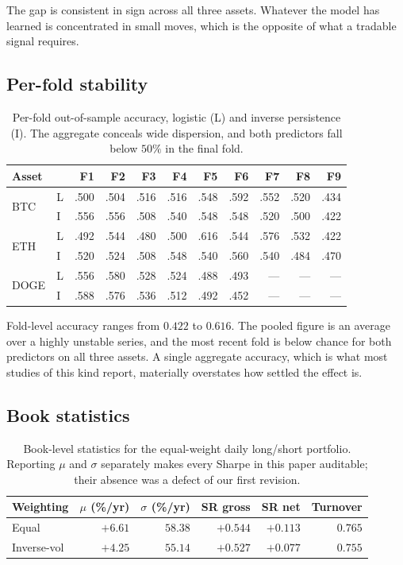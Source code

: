 \documentclass[preprint,12pt,authoryear]{elsarticle}
\begin{document}
The gap is consistent in sign across all three assets. Whatever the model has
learned is concentrated in small moves, which is the opposite of what a tradable
signal requires.

\subsection{Per-fold stability}

\begin{table}[t]\centering\small
\caption{Per-fold out-of-sample accuracy, logistic (L) and inverse persistence
(I). The aggregate conceals wide dispersion, and both predictors fall below
$50\%$ in the final fold.}
\label{tab:folds}
\begin{tabular}{@{}llrrrrrrrrr@{}}
\toprule
Asset & & F1 & F2 & F3 & F4 & F5 & F6 & F7 & F8 & F9 \\
\midrule
\multirow{2}{*}{BTC}  & L & .500 & .504 & .516 & .516 & .548 & .592 & .552 & .520 & .434 \\
                      & I & .556 & .556 & .508 & .540 & .548 & .548 & .520 & .500 & .422 \\
\midrule
\multirow{2}{*}{ETH}  & L & .492 & .544 & .480 & .500 & .616 & .544 & .576 & .532 & .422 \\
                      & I & .520 & .524 & .508 & .548 & .540 & .560 & .540 & .484 & .470 \\
\midrule
\multirow{2}{*}{DOGE} & L & .556 & .580 & .528 & .524 & .488 & .493 & --- & --- & --- \\
                      & I & .588 & .576 & .536 & .512 & .492 & .452 & --- & --- & --- \\
\bottomrule
\end{tabular}
\end{table}

Fold-level accuracy ranges from $0.422$ to $0.616$. The pooled figure is an
average over a highly unstable series, and the most recent fold is below chance
for both predictors on all three assets. A single aggregate accuracy, which is
what most studies of this kind report, materially overstates how settled the
effect is.

\subsection{Book statistics}
\label{ssec:book}

\begin{table}[t]\centering\small
\caption{Book-level statistics for the equal-weight daily long/short portfolio.
Reporting $\mu$ and $\sigma$ separately makes every Sharpe in this paper
auditable; their absence was a defect of our first revision.}
\label{tab:book}
\begin{tabular}{@{}lrrrrr@{}}
\toprule
Weighting & $\mu$ (\%/yr) & $\sigma$ (\%/yr) & SR gross & SR net & Turnover \\
\midrule
Equal            & $+6.61$ & $58.38$ & $+0.544$ & $+0.113$ & $0.765$ \\
Inverse-vol      & $+4.25$ & $55.14$ & $+0.527$ & $+0.077$ & $0.755$ \\
\bottomrule
\end{tabular}
\end{table}
\end{document}
